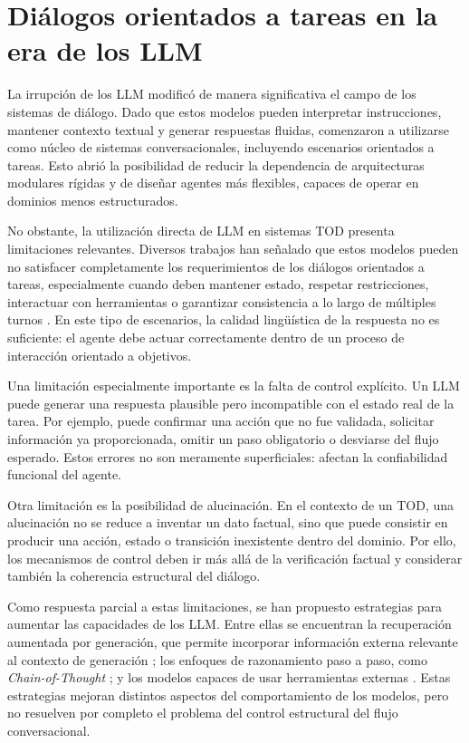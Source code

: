 \section{Diálogos orientados a tareas en la era de los LLM}

La irrupción de los \ac{LLM} modificó de manera significativa el campo de los sistemas
de diálogo. Dado que estos modelos pueden interpretar instrucciones, mantener
contexto textual y generar respuestas fluidas, comenzaron a utilizarse como núcleo de
sistemas conversacionales, incluyendo escenarios orientados a tareas. Esto abrió la
posibilidad de reducir la dependencia de arquitecturas modulares rígidas y de diseñar
agentes más flexibles, capaces de operar en dominios menos estructurados.

No obstante, la utilización directa de \ac{LLM} en sistemas \ac{TOD} presenta limitaciones
relevantes. Diversos trabajos han señalado que estos modelos pueden no satisfacer
completamente los requerimientos de los diálogos orientados a tareas, especialmente
cuando deben mantener estado, respetar restricciones, interactuar con herramientas o
garantizar consistencia a lo largo de múltiples turnos \citep{hudecek2023are,
qin2023chatgpt,zhang2023todllm}. En este tipo de escenarios, la calidad lingüística de
la respuesta no es suficiente: el agente debe actuar correctamente dentro de un proceso
de interacción orientado a objetivos.

Una limitación especialmente importante es la falta de control explícito. Un \ac{LLM}
puede generar una respuesta plausible pero incompatible con el estado real de la tarea.
Por ejemplo, puede confirmar una acción que no fue validada, solicitar información ya
proporcionada, omitir un paso obligatorio o desviarse del flujo esperado. Estos errores
no son meramente superficiales: afectan la confiabilidad funcional del agente.

Otra limitación es la posibilidad de alucinación. En el contexto de un \ac{TOD}, una
alucinación no se reduce a inventar un dato factual, sino que puede consistir en producir
una acción, estado o transición inexistente dentro del dominio. Por ello, los mecanismos
de control deben ir más allá de la verificación factual y considerar también la coherencia
estructural del diálogo.

Como respuesta parcial a estas limitaciones, se han propuesto estrategias para
aumentar las capacidades de los \ac{LLM}. Entre ellas se encuentran la recuperación
aumentada por generación, que permite incorporar información externa relevante al
contexto de generación \citep{lewis2020retrieval}; los enfoques de razonamiento paso
a paso, como \emph{Chain-of-Thought} \citep{wei2022chain}; y los modelos capaces de
usar herramientas externas \citep{schick2023toolformer}. Estas estrategias mejoran
distintos aspectos del comportamiento de los modelos, pero no resuelven por completo
el problema del control estructural del flujo conversacional.

